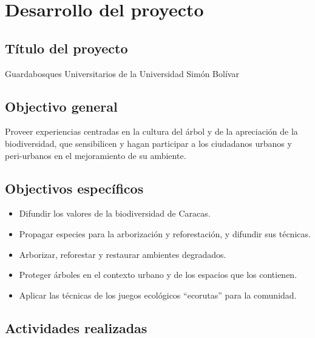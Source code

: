 \chapter*{Desarrollo del proyecto}

\section*{Título del proyecto}

Guardabosques Universitarios de la Universidad Simón Bolívar

\section*{Objectivo general}

Proveer experiencias centradas en la cultura del árbol y de la apreciación de la biodiversidad, que sensibilicen y hagan participar a los ciudadanos urbanos y peri-urbanos en el mejoramiento de su ambiente.

\section*{Objectivos específicos}

\begin{itemize}

\item Difundir los valores de la biodiversidad de Caracas.

\item Propagar especies para la arborización y reforestación, y difundir sus técnicas.

\item Arborizar, reforestar y restaurar ambientes degradados.

\item Proteger árboles en el contexto urbano y de los espacios que los contienen.

\item Aplicar las técnicas de los juegos ecológicos ``ecorutas'' para la comunidad.

\end{itemize}

\section*{Actividades realizadas}

